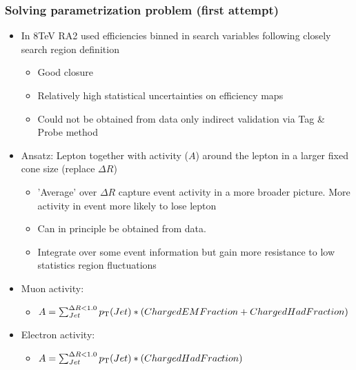\documentclass{beamer}
\begin{document}
\begin{frame}
 \frametitle{Solving parametrization problem (first attempt)}
 \begin{itemize}
  \item In 8TeV RA2 used efficiencies binned in search variables following closely search region definition
  \begin{itemize}
   \item Good closure
   \item Relatively high statistical uncertainties on efficiency maps
   \item Could not be obtained from data only indirect validation via Tag \& Probe method
  \end{itemize}
  \item Ansatz: Lepton \pt together with activity ($A$) around the lepton in a larger fixed cone size (replace $\Delta R$)
  \begin{itemize}
   \item 'Average' over $\Delta R$ capture event activity in a more broader picture. More activity in event more likely to lose lepton
   \item Can in principle be obtained from data. %
   \item Integrate over some event information but gain more resistance to low statistics region fluctuations
  \end{itemize}
   \item Muon activity:
  \begin{itemize}
   \item $A = \sum_{Jet}^{\Delta R<1.0} p_{\text{T}}(Jet) * (ChargedEMFraction + ChargedHadFraction) $
  \end{itemize}
    \item Electron activity:
  \begin{itemize}
   \item $A = \sum_{Jet}^{\Delta R<1.0} p_{\text{T}}(Jet) * (ChargedHadFraction) $
  \end{itemize}
  \end{itemize}

\end{frame}

\end{document}

